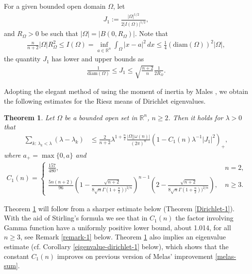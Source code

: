 \documentclass[11pt,twoside, leqno]{article}
\def\rr{{\mathbb R}}
\def\rn{{{\rr}^n}}
\newtheorem{thm}{Theorem}[section]
\numberwithin{equation}{section}
\begin{document}
For a given bounded open domain $\Omega$, let
\begin{align}\label{J-def}
J_1:= \frac{ |\Omega|^{1/2}}{2|I(\Omega)|^{1/2}},
\end{align}
and $R_\Omega>0$ be such that $|\Omega|=|B(0,R_\Omega)|$.
Note that
\begin{align*}
\frac{n}{n+2}|\Omega|R_\Omega^2\le I(\Omega)=\inf_{a\in\rn}\int_\Omega|x-a|^2\,dx\le \frac{1}{4}(\mathrm{diam}(\Omega))^2|\Omega|,
\end{align*}
the quantity $J_1$ has  lower and upper  bounds as
\begin{align}\label{J-diameter}
\frac{1}{\mathrm{diam}(\Omega)}\le J_1\le  \sqrt{\frac{n+2}{n}}\frac{1}{2R_\Omega}.
\end{align}


Adopting the elegant method of using the moment of inertia by Males \cite{Me02}, we obtain the following estimates for the Riesz means of
Dirichlet eigenvalues.
\begin{thm}\label{Dirichlet-2}
Let $\Omega$ be a bounded open set in $\rn$, $n\ge 2$. Then  it holds for $\lambda>0$ that
\begin{align}\label{riesz-dirichlet}
\sum_{k:\,\lambda_k<\lambda}(\lambda-\lambda_k)&\le
\frac{2}{n+2} \lambda^{1+\frac n2} \frac{|\Omega| |\omega(n)|}{(2\pi)^{n}}\left(1 -C_1(n) \lambda^{-1}|J_1|^2\right)_+,
\end{align}
where $a_+=\max\{0,a\}$ and
\begin{align}\label{defn-c1}
C_1(n)=
\begin{cases}
\frac{157}{480}, \ & n=2,\\
\frac{5n(n+2)}{96}\left(1-\frac{\sqrt{n+2}}{8\sqrt n \Gamma(1+\frac n2))^{2/n}}\right)^{n-1}\left(2-\frac{\sqrt{n+2}}{8\sqrt n \Gamma(1+\frac n2))^{2/n}}\right), \ & n\ge 3.
\end{cases}
\end{align}
\end{thm}
Theorem \ref{Dirichlet-2} will follow from a sharper estimate below (Theorem \ref{Dirichlet-1}). With the aid of  Stirling's formula we see that in $C_1(n)$
the  factor involving Gamma function have a uniformly positive lower bound, about 1.014,  for all $n\ge 3$, see Remark \ref{remark-1} below.
Theorem \ref{Dirichlet-2} also implies an eigenvalue estimate (cf. Corollary \ref{eigenvalue-dirichlet-1} below),
which shows that the constant $C_1(n)$ improves on previous version of Melas' improvement \eqref{melas-sum}.
\end{document}
